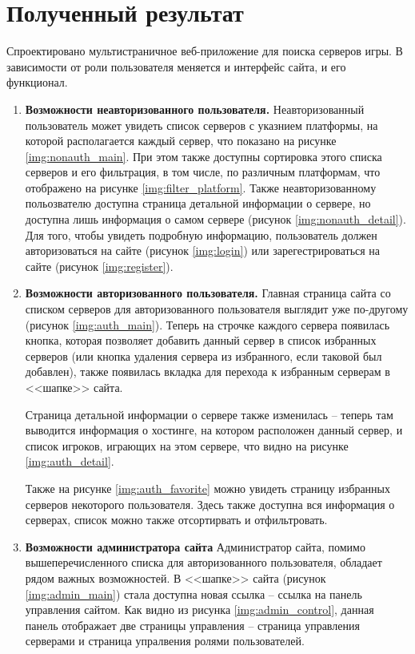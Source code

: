 \section{Полученный результат}

Спроектировано мультистраничное веб-приложение для поиска серверов игры. В зависимости от роли пользователя меняется и интерфейс сайта, и его функционал.

\begin{enumerate}
    \item \textbf{Возможности неавторизованного пользователя.} Неавторизованный пользователь может увидеть список серверов с указнием платформы, на которой располагается каждый сервер, что показано на рисунке \ref{img:nonauth_main}. При этом также доступны сортировка этого списка серверов и его фильтрация, в том числе, по различным платформам, что отображено на рисунке \ref{img:filter_platform}. Также неавторизованному польозвателю доступна страница детальной информации о сервере, но доступна лишь информация о самом сервере (рисунок \ref{img:nonauth_detail}). Для того, чтобы увидеть подробную информацию, пользователь должен авторизоваться на сайте (рисунок \ref{img:login}) или зарегестрироваться на сайте (рисунок \ref{img:register}).
    
    \item \textbf{Возможности авторизованного пользователя.} Главная страница сайта со списком серверов для авторизованного пользователя выглядит уже по-другому (рисунок \ref{img:auth_main}). Теперь на строчке каждого сервера появилась кнопка, которая позволяет добавить данный сервер в список избранных серверов (или кнопка удаления сервера из избранного, если таковой был добавлен), также появилась вкладка для перехода к избранным серверам в <<шапке>> сайта.
    
    Страница детальной информации о сервере также изменилась -- теперь там выводится информация о хостинге, на котором расположен данный сервер, и список игроков, играющих на этом сервере, что видно на рисунке \ref{img:auth_detail}.

    Также на рисунке \ref{img:auth_favorite} можно увидеть страницу избранных серверов некоторого пользователя. Здесь также доступна вся информация о серверах, список можно также отсортирвать и отфильтровать.

    \item \textbf{Возможности администратора сайта} Администратор сайта, помимо вышеперечисленного списка для авторизованного пользователя, обладает рядом важных возможностей. В <<шапке>> сайта (рисунок \ref{img:admin_main}) стала доступна новая ссылка -- ссылка на панель управления сайтом. Как видно из рисунка \ref{img:admin_control}, данная панель отображает две страницы управления -- страница управления серверами и страница упралвения ролями пользователей.
    

\end{enumerate}
